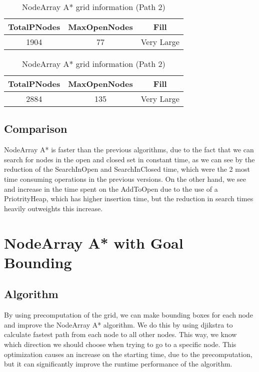 \documentclass{article}
\begin{document}
  \begin{table}[h!]
    \parbox{.45\linewidth}{
        \centering
        \caption{NodeArray A* grid information (Path 1)}
        \label{tab:tableNodeArrayGrid1}
        \begin{tabular}{c|c|c}
          \textbf{TotalPNodes} & \textbf{MaxOpenNodes} & \textbf{Fill}\\
          \hline
          1904 & 77 & Very Large\\
        \end{tabular}
    }
    \hfil
    \parbox{.45\linewidth}{
        \centering
        \caption{NodeArray A* grid information (Path 2)}
        \label{tab:tableNodeArrayGrid2}
        \begin{tabular}{c|c|c}
          \textbf{TotalPNodes} & \textbf{MaxOpenNodes} & \textbf{Fill}\\
          \hline
          2884 & 135 & Very Large\\
        \end{tabular}
    }
  \end{table}

  \subsection{Comparison}
  NodeArray A* is faster than the previous algorithms, due to the fact that we can search for nodes in the open and closed set in constant time, 
  as we can see by the reduction of the SearchInOpen and SearchInClosed time, which were the 2 most time consuming operations in the previous versions. 
  On the other hand, we see and increase in the time spent on the AddToOpen due to the use of a PriotrityHeap, which has higher insertion time, 
  but the reduction in search times heavily outweights this increase.\\

  \section{NodeArray A* with Goal Bounding}
  \subsection{Algorithm}
  By using precomputation of the grid, we can make bounding boxes for each node and improve the NodeArray A* algorithm. We do this by using djikstra to
  calculate fastest path from each node to all other nodes. This way, we know which direction we should choose when trying to go to a specific node.
  This optimization causes an increase on the starting time, due to the precomputation, but it can significantly improve the runtime performance of the algorithm.\\
  
\end{document}
